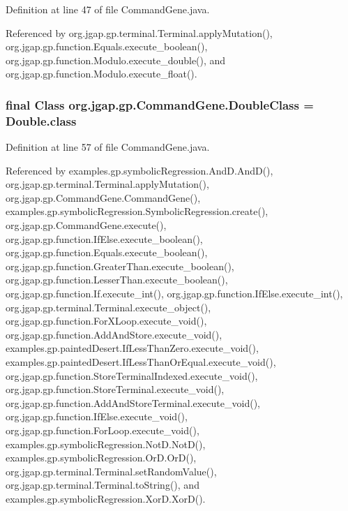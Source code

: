 Definition at line 47 of file Command\-Gene.\-java.



Referenced by org.\-jgap.\-gp.\-terminal.\-Terminal.\-apply\-Mutation(), org.\-jgap.\-gp.\-function.\-Equals.\-execute\-\_\-boolean(), org.\-jgap.\-gp.\-function.\-Modulo.\-execute\-\_\-double(), and org.\-jgap.\-gp.\-function.\-Modulo.\-execute\-\_\-float().

\hypertarget{classorg_1_1jgap_1_1gp_1_1_command_gene_a085d36818c24978468c002c57d982363}{
\subsubsection[{Double\-Class}]{\setlength{\rightskip}{0pt plus 5cm}final Class org.\-jgap.\-gp.\-Command\-Gene.\-Double\-Class = Double.\-class\hspace{0.3cm}{\ttfamily [static]}}}\label{classorg_1_1jgap_1_1gp_1_1_command_gene_a085d36818c24978468c002c57d982363}


Definition at line 57 of file Command\-Gene.\-java.



Referenced by examples.\-gp.\-symbolic\-Regression.\-And\-D.\-And\-D(), org.\-jgap.\-gp.\-terminal.\-Terminal.\-apply\-Mutation(), org.\-jgap.\-gp.\-Command\-Gene.\-Command\-Gene(), examples.\-gp.\-symbolic\-Regression.\-Symbolic\-Regression.\-create(), org.\-jgap.\-gp.\-Command\-Gene.\-execute(), org.\-jgap.\-gp.\-function.\-If\-Else.\-execute\-\_\-boolean(), org.\-jgap.\-gp.\-function.\-Equals.\-execute\-\_\-boolean(), org.\-jgap.\-gp.\-function.\-Greater\-Than.\-execute\-\_\-boolean(), org.\-jgap.\-gp.\-function.\-Lesser\-Than.\-execute\-\_\-boolean(), org.\-jgap.\-gp.\-function.\-If.\-execute\-\_\-int(), org.\-jgap.\-gp.\-function.\-If\-Else.\-execute\-\_\-int(), org.\-jgap.\-gp.\-terminal.\-Terminal.\-execute\-\_\-object(), org.\-jgap.\-gp.\-function.\-For\-X\-Loop.\-execute\-\_\-void(), org.\-jgap.\-gp.\-function.\-Add\-And\-Store.\-execute\-\_\-void(), examples.\-gp.\-painted\-Desert.\-If\-Less\-Than\-Zero.\-execute\-\_\-void(), examples.\-gp.\-painted\-Desert.\-If\-Less\-Than\-Or\-Equal.\-execute\-\_\-void(), org.\-jgap.\-gp.\-function.\-Store\-Terminal\-Indexed.\-execute\-\_\-void(), org.\-jgap.\-gp.\-function.\-Store\-Terminal.\-execute\-\_\-void(), org.\-jgap.\-gp.\-function.\-Add\-And\-Store\-Terminal.\-execute\-\_\-void(), org.\-jgap.\-gp.\-function.\-If\-Else.\-execute\-\_\-void(), org.\-jgap.\-gp.\-function.\-For\-Loop.\-execute\-\_\-void(), examples.\-gp.\-symbolic\-Regression.\-Not\-D.\-Not\-D(), examples.\-gp.\-symbolic\-Regression.\-Or\-D.\-Or\-D(), org.\-jgap.\-gp.\-terminal.\-Terminal.\-set\-Random\-Value(), org.\-jgap.\-gp.\-terminal.\-Terminal.\-to\-String(), and examples.\-gp.\-symbolic\-Regression.\-Xor\-D.\-Xor\-D().

